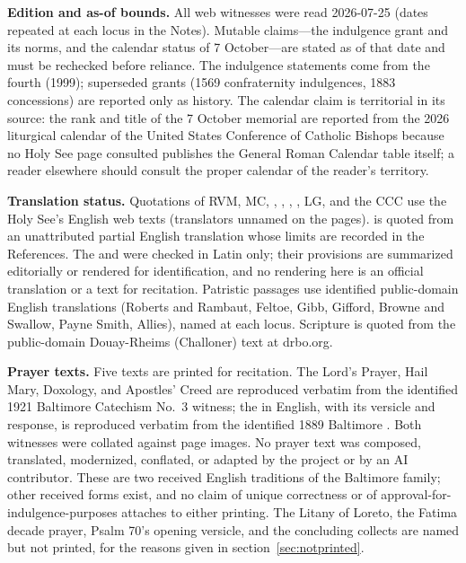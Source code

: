 \textbf{Edition and as-of bounds.} All web witnesses were read
2026-07-25 (dates repeated at each locus in the Notes). Mutable
claims---the indulgence grant and its norms, and the calendar status of
7 October---are stated as of that date and must be rechecked before
reliance. The indulgence statements come from the fourth
 (1999); superseded grants (1569
confraternity indulgences, 1883 concessions) are reported only as
history. The calendar claim is territorial in its source: the rank and
title of the 7 October memorial are reported from the 2026 liturgical
calendar of the United States Conference of Catholic Bishops because no
Holy See page consulted publishes the General Roman Calendar table
itself; a reader elsewhere should consult the proper calendar of the
reader's territory.

\textbf{Translation status.} Quotations of RVM, MC, , , , , LG, and the CCC use the Holy See's
English web texts (translators unnamed on the pages).
 is quoted from an unattributed partial English
translation whose limits are recorded in the References. The
 and  were checked
in Latin only; their provisions are summarized editorially or rendered
for identification, and no rendering here is an official translation or
a text for recitation. Patristic passages use identified public-domain
English translations (Roberts and Rambaut, Feltoe, Gibb, Gifford, Browne
and Swallow, Payne Smith, Allies), named at each locus. Scripture is
quoted from the public-domain Douay-Rheims (Challoner) text at drbo.org.

\textbf{Prayer texts.} Five texts are printed for recitation. The Lord's
Prayer, Hail Mary, Doxology, and Apostles' Creed are reproduced verbatim
from the identified 1921 Baltimore Catechism No.~3 witness; the
 in English, with its versicle and response, is
reproduced verbatim from the identified 1889 Baltimore . Both witnesses were collated against page images. No prayer
text was composed, translated, modernized, conflated, or adapted by the
project or by an AI contributor. These are two received English
traditions of the Baltimore family; other received forms exist, and no
claim of unique correctness or of approval-for-indulgence-purposes
attaches to either printing. The Litany of Loreto, the Fatima decade
prayer, Psalm 70's opening versicle, and the concluding collects are
named but not printed, for the reasons given in
section~\ref{sec:notprinted}.

